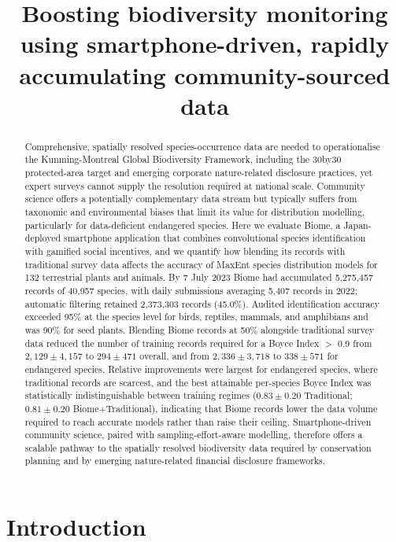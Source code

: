 \documentclass[11pt]{article}
\title{Boosting biodiversity monitoring using smartphone-driven, rapidly accumulating community-sourced data}
\author{}
\date{}
\begin{document}
\maketitle

\begin{abstract}
Comprehensive, spatially resolved species-occurrence data are needed to operationalise the Kunming-Montreal Global Biodiversity Framework, including the 30by30 protected-area target and emerging corporate nature-related disclosure practices, yet expert surveys cannot supply the resolution required at national scale. Community science offers a potentially complementary data stream but typically suffers from taxonomic and environmental biases that limit its value for distribution modelling, particularly for data-deficient endangered species. Here we evaluate Biome, a Japan-deployed smartphone application that combines convolutional species identification with gamified social incentives, and we quantify how blending its records with traditional survey data affects the accuracy of MaxEnt species distribution models for 132 terrestrial plants and animals. By 7 July 2023 Biome had accumulated 5{,}275{,}457 records of 40{,}957 species, with daily submissions averaging 5{,}407 records in 2022; automatic filtering retained 2{,}373{,}303 records (45.0\%). Audited identification accuracy exceeded 95\% at the species level for birds, reptiles, mammals, and amphibians and was 90\% for seed plants. Blending Biome records at 50\% alongside traditional survey data reduced the number of training records required for a Boyce Index $>$ 0.9 from $2{,}129 \pm 4{,}157$ to $294 \pm 471$ overall, and from $2{,}336 \pm 3{,}718$ to $338 \pm 571$ for endangered species. Relative improvements were largest for endangered species, where traditional records are scarcest, and the best attainable per-species Boyce Index was statistically indistinguishable between training regimes ($0.83 \pm 0.20$ Traditional; $0.81 \pm 0.20$ Biome+Traditional), indicating that Biome records lower the data volume required to reach accurate models rather than raise their ceiling. Smartphone-driven community science, paired with sampling-effort-aware modelling, therefore offers a scalable pathway to the spatially resolved biodiversity data required by conservation planning and by emerging nature-related financial disclosure frameworks.
\end{abstract}

\section{Introduction}
\end{document}
